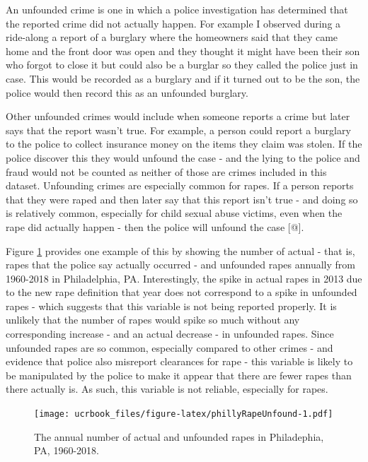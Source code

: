 \documentclass[
  12pt,
  openany]{book}
\begin{document}
An unfounded crime is one in which a police investigation has determined that the reported crime did not actually happen. For example I observed during a ride-along a report of a burglary where the homeowners said that they came home and the front door was open and they thought it might have been their son who forgot to close it but could also be a burglar so they called the police just in case. This would be recorded as a burglary and if it turned out to be the son, the police would then record this as an unfounded burglary.

Other unfounded crimes would include when someone reports a crime but later says that the report wasn't true. For example, a person could report a burglary to the police to collect insurance money on the items they claim was stolen. If the police discover this they would unfound the case - and the lying to the police and fraud would not be counted as neither of those are crimes included in this dataset. Unfounding crimes are especially common for rapes. If a person reports that they were raped and then later say that this report isn't true - and doing so is relatively common, especially for child sexual abuse victims, even when the rape did actually happen - then the police will unfound the case {[}@{]}.

Figure \ref{fig:phillyRapeUnfound} provides one example of this by showing the number of actual - that is, rapes that the police say actually occurred - and unfounded rapes annually from 1960-2018 in Philadelphia, PA. Interestingly, the spike in actual rapes in 2013 due to the new rape definition that year does not correspond to a spike in unfounded rapes - which suggests that this variable is not being reported properly. It is unlikely that the number of rapes would spike so much without any corresponding increase - and an actual decrease - in unfounded rapes. Since unfounded rapes are so common, especially compared to other crimes - and evidence that police also misreport clearances for rape - this variable is likely to be manipulated by the police to make it appear that there are fewer rapes than there actually is. As such, this variable is not reliable, especially for rapes.

\begin{figure}
\centering
\texttt{[image: ucrbook\_files/figure-latex/phillyRapeUnfound-1.pdf]}
\caption{\label{fig:phillyRapeUnfound}The annual number of actual and unfounded rapes in Philadephia, PA, 1960-2018.}
\end{figure}
\end{document}
